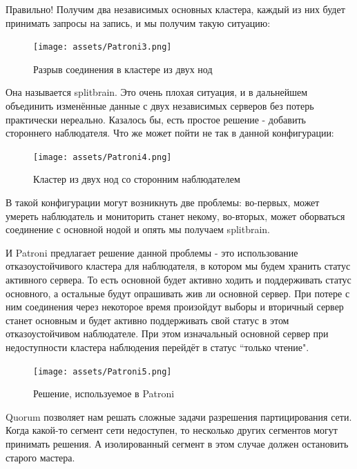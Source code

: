 Правильно! Получим два независимых основных кластера, каждый из них будет принимать запросы на запись, и мы получим такую ситуацию:

\begin{figure}[h]
    \centering
    \texttt{[image: assets/Patroni3.png]}
    \caption{Разрыв соединения в кластере из двух нод}
    \label{fig:mesh5}
\end{figure}

Она называется splitbrain. Это очень плохая ситуация, и в дальнейшем объединить изменённые данные с двух независимых серверов без потерь практически нереально.
Казалось бы, есть простое решение - добавить стороннего наблюдателя.
Что же может пойти не так в данной конфигурации:

\begin{figure}[h]
    \centering
    \texttt{[image: assets/Patroni4.png]}
    \caption{Кластер из двух нод со сторонним наблюдателем}
    \label{fig:mesh6}
\end{figure}

В такой конфигурации могут возникнуть две проблемы: во-первых, может умереть наблюдатель и мониторить станет некому, во-вторых, может оборваться соединение с основной нодой и опять мы получаем splitbrain. 

И Patroni предлагает решение данной проблемы - это использование отказоустойчивого кластера для наблюдателя, в котором мы будем хранить статус активного сервера. То есть основной будет активно ходить и поддерживать статус основного, а остальные будут опрашивать жив ли основной сервер. При потере с ним соединения через некоторое время произойдут выборы и вторичный сервер станет основным и будет активно поддерживать свой статус в этом отказоустойчивом наблюдателе. При этом изначальный основной сервер при недоступности кластера наблюдения перейдёт в статус “только чтение".

\begin{figure}[h]
    \centering
    \texttt{[image: assets/Patroni5.png]}
    \caption{Решение, используемое в Patroni}
    \label{fig:mesh7}
\end{figure}

Quorum позволяет нам решать сложные задачи разрешения партицирования сети. Когда какой-то сегмент сети недоступен, то несколько других сегментов могут принимать решения. А изолированный сегмент в этом случае должен остановить старого мастера. 

